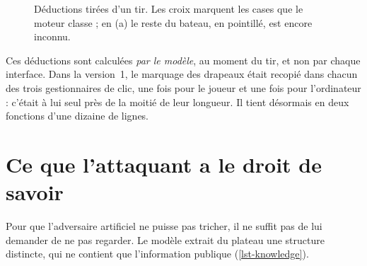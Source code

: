 \begin{figure}[ht]
    \centering
    \caption{Déductions tirées d'un tir. Les croix marquent les cases que le moteur classe
         ; en (a) le reste du bateau, en pointillé, est encore inconnu.}
    \label{fig-deductions}
\end{figure}

Ces déductions sont calculées \emph{par le modèle}, au moment du tir, et non par chaque
interface. Dans la version~1, le marquage des drapeaux était recopié dans chacun des trois
gestionnaires de clic, une fois pour le joueur et une fois pour l'ordinateur : c'était à
lui seul près de la moitié de leur longueur. Il tient désormais en deux fonctions d'une
dizaine de lignes.

\section{Ce que l'attaquant a le droit de savoir}
\label{sec-connaissance}

Pour que l'adversaire artificiel ne puisse pas tricher, il ne suffit pas de lui demander
de ne pas regarder. Le modèle extrait du plateau une structure distincte, qui ne contient
que l'information publique (\cref{lst-knowledge}).

